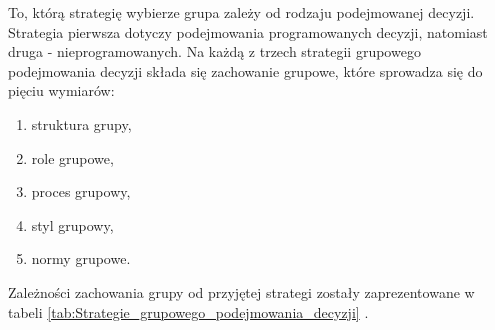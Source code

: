 To, którą strategię wybierze grupa zależy od rodzaju podejmowanej decyzji. 
Strategia pierwsza dotyczy podejmowania programowanych decyzji, natomiast druga
- nieprogramowanych. Na każdą z trzech strategii grupowego podejmowania decyzji 
składa się zachowanie grupowe, które sprowadza się do pięciu wymiarów:
\begin{enumerate}[1)]
  \item struktura grupy,
  \item role grupowe,
  \item proces grupowy,
  \item styl grupowy,
  \item normy grupowe.
\end{enumerate}

Zależności zachowania grupy od przyjętej strategi zostały zaprezentowane w 
tabeli \ref{tab:Strategie_grupowego_podejmowania_decyzji} \cite{Harrison1999}.
